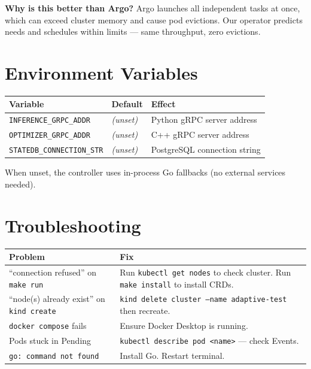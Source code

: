 \documentclass[11pt,a4paper]{article}
\begin{document}
\begin{tipbox}
\textbf{Why is this better than Argo?} Argo launches all independent tasks at once, which can exceed cluster memory and cause pod evictions. Our operator predicts needs and schedules within limits --- same throughput, zero evictions.
\end{tipbox}

\section{Environment Variables}

\begin{center}
\begin{tabular}{|l|l|l|}
\hline
\textbf{Variable} & \textbf{Default} & \textbf{Effect} \\
\hline
\texttt{INFERENCE\_GRPC\_ADDR} & \textit{(unset)} & Python gRPC server address \\
\texttt{OPTIMIZER\_GRPC\_ADDR} & \textit{(unset)} & C++ gRPC server address \\
\texttt{STATEDB\_CONNECTION\_STR} & \textit{(unset)} & PostgreSQL connection string \\
\hline
\end{tabular}
\end{center}

When unset, the controller uses in-process Go fallbacks (no external services needed).

\section{Troubleshooting}

\begin{center}
\begin{tabular}{|p{5cm}|p{8cm}|}
\hline
\textbf{Problem} & \textbf{Fix} \\
\hline
``connection refused'' on \texttt{make run} & Run \texttt{kubectl get nodes} to check cluster. Run \texttt{make install} to install CRDs. \\
\hline
``node(s) already exist'' on \texttt{kind create} & \texttt{kind delete cluster --name adaptive-test} then recreate. \\
\hline
\texttt{docker compose} fails & Ensure Docker Desktop is running. \\
\hline
Pods stuck in Pending & \texttt{kubectl describe pod <name>} --- check Events. \\
\hline
\texttt{go: command not found} & Install Go. Restart terminal. \\
\hline
\end{tabular}
\end{center}
\end{document}
